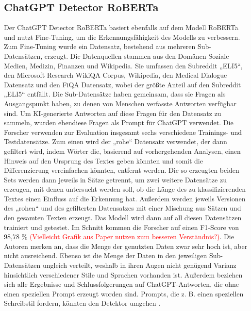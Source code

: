 \subsection{ChatGPT Detector RoBERTa}
\label{subsec:chatgptdetectorroberta}
Der ChatGPT Detector RoBERTa basiert ebenfalls auf dem Modell RoBERTa und nutzt Fine-Tuning, um die Erkennungsfähigkeit des Modells zu verbessern. Zum Fine-Tuning wurde ein Datensatz, bestehend aus mehreren Sub-Datensätzen, erzeugt. Die Datenquellen stammen aus den Domänen Soziale Medien, Medizin, Finanzen und Wikipedia. Sie umfassen den Subreddit „ELI5“, den Microsoft Research WikiQA Corpus, Wikipedia, den Medical Dialogue Datensatz und den FiQA Datensatz, wobei der größte Anteil auf den Subreddit „ELI5“ entfällt. Die Sub-Datensätze haben gemeinsam, dass sie Fragen als Ausgangspunkt haben, zu denen von Menschen verfasste Antworten verfügbar sind. Um KI-generierte Antworten auf diese Fragen für den Datensatz zu sammeln, wurden ebendiese Fragen als Prompt für ChatGPT verwendet. Die Forscher verwenden zur Evaluation insgesamt sechs verschiedene Trainings- und Testdatensätze. Zum einen wird der „rohe“ Datensatz verwendet, der dann gefiltert wird, indem Wörter die, basierend auf vorhergehenden Analysen, einen Hinweis auf den Ursprung des Textes geben könnten und somit die Differenzierung vereinfachen könnten, entfernt werden. Die so erzeugten beiden Sets werden dann jeweils in Sätze getrennt, um zwei weitere Datensätze zu erzeugen, mit denen untersucht werden soll, ob die Länge des zu klassifizierenden Textes einen Einfluss auf die Erkennung hat. Außerdem werden jeweils Versionen des „rohen“ und des gefilterten Datensatzes mit einer Mischung aus Sätzen und den gesamten Texten erzeugt. Das Modell wird dann auf all diesen Datensätzen trainiert und getestet. Im Schnitt kommen die Forscher auf einen F1-Score von 98,78 \%  \textcolor{red}{(Vielleicht Grafik aus Paper nutzen zum besseren Verständnis?)}. Die Autoren merken an, dass die Menge der genutzten Daten zwar sehr hoch ist, aber nicht ausreichend. Ebenso ist die Menge der Daten in den jeweiligen Sub-Datensätzen ungleich verteilt, weshalb in ihren Augen nicht genügend Varianz hinsichtlich verschiedener Stile und Sprachen vorhanden ist. Außerdem beziehen sich alle Ergebnisse und Schlussfolgerungen auf ChatGPT-Antworten, die ohne einen speziellen Prompt erzeugt worden sind. Prompts, die z. B. einen speziellen Schreibstil fordern, könnten den Detektor umgehen \autocite{guo2023closechatgpthumanexperts}. \\
